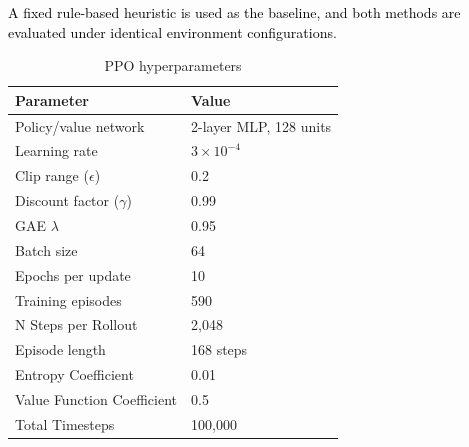\documentclass[conference]{IEEEtran}
\begin{document}
\textcolor{black}{A fixed rule-based heuristic is used as the baseline, and both methods are evaluated under identical environment configurations}. 


\vspace{-0.5cm}
\begin{table}[!htbp]
\tiny
\caption{PPO hyperparameters}
\vspace{-0.3cm}
\label{tab:ppo_hyperparams}
\centering
\begin{tabular}{@{}ll@{}}
\toprule
\textbf{Parameter} & \textbf{Value} \\
\midrule
Policy/value network      & 2-layer MLP, 128 units \\
Learning rate             & $3 \times 10^{-4}$ \\
Clip range ($\epsilon$)   & 0.2 \\
Discount factor ($\gamma$) & 0.99 \\
GAE $\lambda$             & 0.95 \\
Batch size                & 64 \\
Epochs per update         & 10 \\
Training episodes         & 590 \\
N Steps per Rollout       & 2,048 \\
Episode length          & 168 steps \\
Entropy Coefficient & 0.01 \\
Value Function Coefficient & 0.5 \\
Total Timesteps & 100,000 \\
\bottomrule
\end{tabular}
\end{table}


\vspace{-0.5cm}
\end{document}
